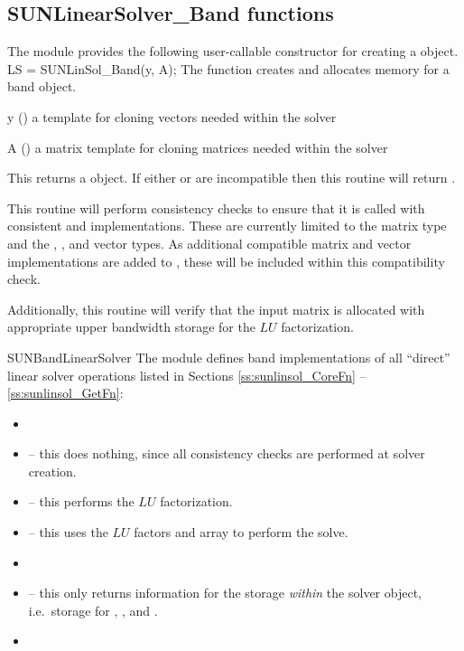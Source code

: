 \subsection{SUNLinearSolver\_Band functions}
\label{ss:sunlinsol_band_functions}

The {\sunlinsolband} module provides the following user-callable constructor
for creating a \newline {} object.
%
%
{
  LS = SUNLinSol\_Band(y, A);
}
{
  The function  creates and allocates memory for
  a band \newline {} object.
}
{
  \begin{args}[y]
  \item[y] ()
    a template for cloning vectors needed within the solver
  \item[A] ()
    a {\sunmatband} matrix template for cloning matrices needed
    within the solver
  \end{args}
}
{
  This returns a  object.  If either  or
   are incompatible then this routine will return .
}
{
  This routine will perform consistency checks to ensure that it is
  called with consistent {\nvector} and {\sunmatrix} implementations.
  These are currently limited to the {\sunmatband} matrix type and
  the {\nvecs}, {\nvecopenmp}, and {\nvecpthreads} vector types.  As
  additional compatible matrix and vector implementations are added to
  {\sundials}, these will be included within this compatibility check.

  Additionally, this routine will verify that the input matrix 
  is allocated with appropriate upper bandwidth storage for the $LU$
  factorization.
}
{SUNBandLinearSolver}
%
%
The {\sunlinsolband} module defines band implementations of all
``direct'' linear solver operations listed in Sections
\ref{ss:sunlinsol_CoreFn} -- \ref{ss:sunlinsol_GetFn}:
\begin{itemize}
\item {}
\item {} -- this does nothing, since all
  consistency checks are performed at solver creation.
\item {} -- this performs the $LU$ factorization.
\item {} -- this uses the $LU$ factors
  and  array to perform the solve.
\item {}
\item {} -- this only returns information for
  the storage \emph{within} the solver object, i.e.~storage
  for , , and .
\item {}
\end{itemize}
